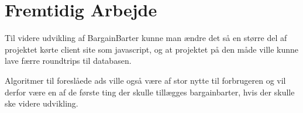 \chapter{Fremtidig Arbejde}

Til videre udvikling af BargainBarter kunne man ændre det så en større del af projektet kørte client site som javascript, og at projektet på den måde ville kunne lave færre roundtrips til databasen. 

Algoritmer til foreslåede ads ville også være af stor nytte til forbrugeren og vil derfor være en af de første ting der skulle tillægges bargainbarter, hvis der skulle ske videre udvikling.   